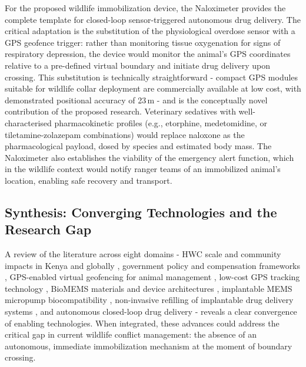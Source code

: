 \documentclass[12pt,a4paper]{article}
\begin{document}
    For the proposed wildlife immobilization device, the Naloximeter provides the complete
    template for closed-loop sensor-triggered autonomous drug delivery. The critical adaptation
    is the substitution of the physiological overdose sensor with a GPS geofence trigger:
    rather than monitoring tissue oxygenation for signs of respiratory depression, the device
    would monitor the animal's GPS coordinates relative to a pre-defined virtual boundary and
    initiate drug delivery upon crossing. This substitution is technically straightforward -
    compact GPS modules suitable for wildlife collar deployment are commercially available at
    low cost, with demonstrated positional accuracy of 23\,m \cite{imamoglu2022} - and is
    the conceptually novel contribution of the proposed research. Veterinary sedatives with
    well-characterised pharmacokinetic profiles (e.g., etorphine, medetomidine, or tiletamine-zolazepam combinations) would replace naloxone as the pharmacological
    payload, dosed by species and estimated body mass. The Naloximeter also establishes the
    viability of the emergency alert function, which in the wildlife context would notify ranger
    teams of an immobilized animal's location, enabling safe recovery and transport.

    \subsection{Synthesis: Converging Technologies and the Research Gap}

    A review of the literature across eight domains - HWC scale and
    community impacts in Kenya and globally
    \cite{muliya2026,manoa2020,mbiki2025,basak2023}, government policy and compensation
    frameworks \cite{kenya2025}, GPS-enabled virtual geofencing for animal management
    \cite{gilbert2026}, low-cost GPS tracking technology \cite{imamoglu2022}, BioMEMS
    materials and device architectures \cite{abhinav2025}, implantable MEMS micropump
    biocompatibility \cite{gutierrez2014}, non-invasive refilling of implantable drug delivery
    systems \cite{iacovacci2021}, and autonomous closed-loop drug delivery \cite{ciatti2024}
    - reveals a clear convergence of enabling technologies. When integrated, these advances
    could address the critical gap in current wildlife conflict management: the absence of an
    autonomous, immediate immobilization mechanism at the moment of boundary crossing.
\end{document}

